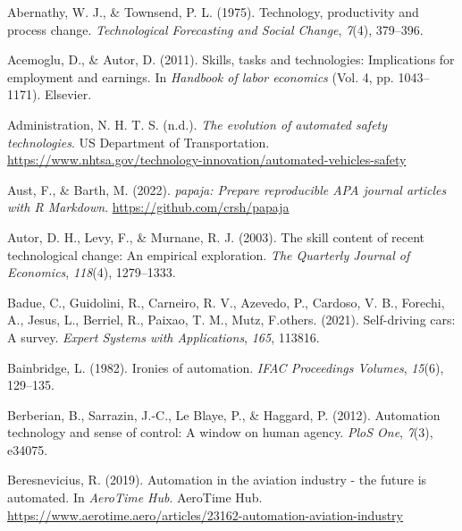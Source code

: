 \documentclass[
  man,floatsintext]{apa7}
\newlength{\cslhangindent}
\newlength{\cslentryspacingunit} %
\newenvironment{CSLReferences}[2] %
 {%
  \setlength{\parindent}{0pt}
  \ifodd #1
  \let\oldpar\par
  \def\par{\hangindent=\cslhangindent\oldpar}
  \fi
  \setlength{\parskip}{#2\cslentryspacingunit}
 }%
 {}
\begin{document}
\hypertarget{refs}{}
\begin{CSLReferences}{1}{0}
\leavevmode{}%
Abernathy, W. J., \& Townsend, P. L. (1975). Technology, productivity and process change. \emph{Technological Forecasting and Social Change}, \emph{7}(4), 379--396.

\leavevmode{}%
Acemoglu, D., \& Autor, D. (2011). Skills, tasks and technologies: Implications for employment and earnings. In \emph{Handbook of labor economics} (Vol. 4, pp. 1043--1171). Elsevier.

\leavevmode{}%
Administration, N. H. T. S. (n.d.). \emph{The evolution of automated safety technologies}. US Department of Transportation. \url{https://www.nhtsa.gov/technology-innovation/automated-vehicles-safety}

\leavevmode{}%
Aust, F., \& Barth, M. (2022). \emph{{papaja}: {Prepare} reproducible {APA} journal articles with {R Markdown}}. \url{https://github.com/crsh/papaja}

\leavevmode{}%
Autor, D. H., Levy, F., \& Murnane, R. J. (2003). The skill content of recent technological change: An empirical exploration. \emph{The Quarterly Journal of Economics}, \emph{118}(4), 1279--1333.

\leavevmode{}%
Badue, C., Guidolini, R., Carneiro, R. V., Azevedo, P., Cardoso, V. B., Forechi, A., Jesus, L., Berriel, R., Paixao, T. M., Mutz, F.others. (2021). Self-driving cars: A survey. \emph{Expert Systems with Applications}, \emph{165}, 113816.

\leavevmode{}%
Bainbridge, L. (1982). Ironies of automation. \emph{IFAC Proceedings Volumes}, \emph{15}(6), 129--135.

\leavevmode{}%
Berberian, B., Sarrazin, J.-C., Le Blaye, P., \& Haggard, P. (2012). Automation technology and sense of control: A window on human agency. \emph{PloS One}, \emph{7}(3), e34075.

\leavevmode{}%
Beresnevicius, R. (2019). Automation in the aviation industry - the future is automated. In \emph{AeroTime Hub}. AeroTime Hub. \url{https://www.aerotime.aero/articles/23162-automation-aviation-industry}


\end{CSLReferences}
\end{document}

